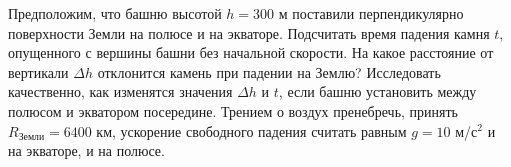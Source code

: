 
Предположим, что башню высотой $h=300$ м поставили перпендикулярно поверхности Земли на полюсе и на экваторе. 
Подсчитать время падения камня $t$, опущенного с вершины башни без начальной скорости. На какое расстояние от 
вертикали $\Delta h$ отклонится камень при падении на Землю? Исследовать качественно, как изменятся значения  $\Delta h$ и  
$t$, если башню установить между полюсом и экватором посередине. Трением о воздух пренебречь, принять $R_\text{Земли} = 6400$ км, 
ускорение свободного падения считать равным $g=10$ м/с$^2$ и на экваторе, и на полюсе.